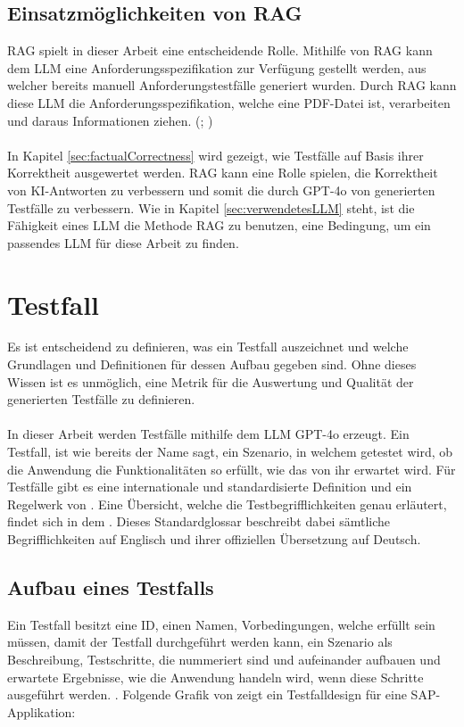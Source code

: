 \documentclass[12pt,toc=bib,toc=listof]{scrreprt}
\begin{document}
\subsection{Einsatzmöglichkeiten von RAG} %
\label{sec:einsatzmöglichkeitenVonRAG}
RAG spielt in dieser Arbeit eine entscheidende Rolle. Mithilfe von RAG kann dem LLM eine Anforderungsspezifikation zur Verfügung gestellt werden, aus welcher bereits manuell Anforderungstestfälle generiert wurden. Durch RAG kann diese LLM die Anforderungsspezifikation, welche eine PDF-Datei ist, verarbeiten und daraus Informationen ziehen. (\cite{Gao2024}; \cite{Wu2024})\\
\\
In Kapitel \ref{sec:factualCorrectness} wird gezeigt, wie Testfälle auf Basis ihrer Korrektheit ausgewertet werden. RAG kann eine Rolle spielen, die Korrektheit von KI-Antworten zu verbessern und somit die durch GPT-4o von \textcite{OpenAI2025} generierten Testfälle zu verbessern. Wie in Kapitel \ref{sec:verwendetesLLM} steht, ist die Fähigkeit eines LLM die Methode RAG zu benutzen, eine Bedingung, um ein passendes LLM für diese Arbeit zu finden.

\section{Testfall} %
\label{sec:testfall}
Es ist entscheidend zu definieren, was ein Testfall auszeichnet und welche Grundlagen und Definitionen für dessen Aufbau gegeben sind. Ohne dieses Wissen ist es unmöglich, eine Metrik für die Auswertung und Qualität der generierten Testfälle zu definieren.\\
\\
In dieser Arbeit werden Testfälle mithilfe dem LLM GPT-4o erzeugt. Ein Testfall, ist wie bereits der Name sagt, ein Szenario, in welchem getestet wird, ob die Anwendung die Funktionalitäten so erfüllt, wie das von ihr erwartet wird. Für Testfälle gibt es eine internationale und standardisierte Definition und ein Regelwerk von \textcite{IsoIecIeee2024}. Eine Übersicht, welche die Testbegrifflichkeiten genau erläutert, findet sich in dem \textcite{Istqb2017}. Dieses Standardglossar beschreibt dabei sämtliche Begrifflichkeiten auf Englisch und ihrer offiziellen Übersetzung auf Deutsch.
\newpage

\subsection{Aufbau eines Testfalls} %
\label{sec:aufbauEinesTestfalls}
Ein Testfall besitzt eine ID, einen Namen, Vorbedingungen, welche erfüllt sein müssen, damit der Testfall durchgeführt werden kann, ein Szenario als Beschreibung, Testschritte, die nummeriert sind und aufeinander aufbauen und erwartete Ergebnisse, wie die Anwendung handeln wird, wenn diese Schritte ausgeführt werden. \textcite{IsoIecIeee2024}. Folgende Grafik von \textcite{Enderli2019} zeigt ein Testfalldesign für eine SAP-Applikation:
\end{document}
